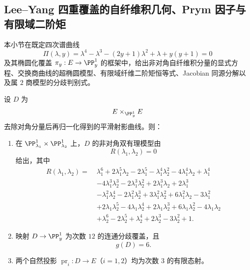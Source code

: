 \subsection{Lee--Yang 四重覆盖的自纤维积几何、Prym 因子与有限域二阶矩}\label{subsec:conclusion-leyang-self-fiber-product-prym-second-moment}
本小节在既定四次谱曲线
\[
\Pi(\lambda,y)=\lambda^{4}-\lambda^{3}-(2y+1)\lambda^{2}+\lambda+y(y+1)=0
\]
及其椭圆化覆盖 \(\pi_y:E\to\PP^1_y\) 的框架中，给出非对角自纤维积分量的显式方程、交换商曲线的超椭圆模型、有限域纤维二阶矩恒等式、Jacobian 同源分解以及属 \(2\) 商模型的分歧判别式。

\begin{theorem}[非对角自纤维积分量的显式模型与属数]\label{thm:conclusion-leyang-self-fiber-product-genus6}
设 \(D\) 为
\[
E\times_{\PP^1_y}E
\]
去除对角分量后再归一化得到的平滑射影曲线。则：
\begin{enumerate}
  \item 在 \(\PP^1_{\lambda_1}\times\PP^1_{\lambda_2}\) 上，\(D\) 的非对角双有理模型由
  \[
  R(\lambda_1,\lambda_2)=0
  \]
  给出，其中
  \[
  \begin{aligned}
  R(\lambda_1,\lambda_2)=\;&\lambda_1^6+2\lambda_1^5\lambda_2-2\lambda_1^5-\lambda_1^4\lambda_2^2-4\lambda_1^4\lambda_2+\lambda_1^4\\
  &-4\lambda_1^3\lambda_2^3-2\lambda_1^3\lambda_2^2+2\lambda_1^3\lambda_2+2\lambda_1^3\\
  &-\lambda_1^2\lambda_2^4-2\lambda_1^2\lambda_2^3+3\lambda_1^2\lambda_2^2+6\lambda_1^2\lambda_2-3\lambda_1^2\\
  &+2\lambda_1\lambda_2^5-4\lambda_1\lambda_2^4+2\lambda_1\lambda_2^3+6\lambda_1\lambda_2^2-4\lambda_1\lambda_2\\
  &+\lambda_2^6-2\lambda_2^5+\lambda_2^4+2\lambda_2^3-3\lambda_2^2+1.
  \end{aligned}
  \]
  \item 映射 \(D\to\PP^1_y\) 为次数 \(12\) 的连通分歧覆盖，且
  \[
  g(D)=6.
  \]
  \item 两个自然投影 \(\operatorname{pr}_i:D\to E\)（\(i=1,2\)）均为次数 \(3\) 的有限态射。
\end{enumerate}
\end{theorem}
